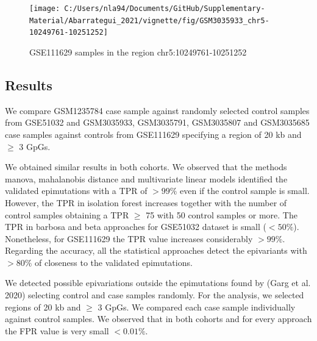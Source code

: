 \documentclass[
]{article}
\begin{document}
\begin{figure}[H]

{\centering \texttt{[image: C:/Users/nla94/Documents/GitHub/Supplementary-Material/Abarrategui\_2021/vignette/fig/GSM3035933\_chr5-10249761-10251252]} 

}

\caption{GSE111629 samples in the region chr5:10249761-10251252}\label{fig:graph_GSM3035933}
\end{figure}

\hypertarget{results}{%
\subsection{Results}\label{results}}

We compare GSM1235784 case sample against randomly selected control
samples from GSE51032 and GSM3035933, GSM3035791, GSM3035807 and
GSM3035685 case samples against controls from GSE111629 specifying a
region of 20 kb and \(\ge\) 3 GpGs.

We obtained similar results in both cohorts. We observed that the
methods manova, mahalanobis distance and multivariate linear models
identified the validated epimutations with a TPR of \(>99\%\) even if
the control sample is small. However, the TPR in isolation forest
increases together with the number of control samples obtaining a TPR
\(\ge\) 75 with 50 control samples or more. The TPR in barbosa and beta
approaches for GSE51032 dataset is small (\(<50\%\)). Nonetheless, for
GSE111629 the TPR value increases considerably \(>99\%\). Regarding the
accuracy, all the statistical approaches detect the epivariants with
\(>80\%\) of closeness to the validated epimutations.

We detected possible epivariations outside the epimutations found by
(Garg et al. 2020) selecting control and case samples randomly. For the
analysis, we selected regions of 20 kb and \(\ge\) 3 GpGs. We compared
each case sample individually against control samples. We observed that
in both cohorts and for every approach the FPR value is very small
\(<0.01\%\).
\end{document}
